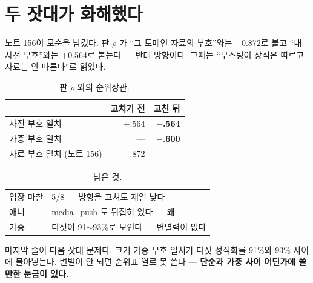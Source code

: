 \documentclass[10pt]{article}
\begin{document}
\section{두 잣대가 화해했다}

노트 156이 모순을 남겼다. 판 $\rho$ 가 ``그 도메인 자료의 부호''와는
$-$0.872로 붙고 ``내 사전 부호''와는 $+$0.564로 붙는다 --- 반대 방향이다.
그때는 ``부스팅이 상식은 따르고 자료는 안 따른다''로 읽었다.

\begin{table}[t]
\centering\tsize
\caption{판 $\rho$ 와의 순위상관.}
\begin{tabular}{lrr}
\toprule
& 고치기 전 & \textbf{고친 뒤} \\
\midrule
사전 부호 일치 & $+$.564 & \textbf{$-$.564} \\
가중 부호 일치 & --- & \textbf{$-$.600} \\
자료 부호 일치 (노트 156) & $-$.872 & --- \\
\bottomrule
\end{tabular}
\end{table}



\begin{table}[t]
\centering\tsize
\caption{남은 것.}
\begin{tabular}{ll}
\toprule
입장 마찰 & 5/8 --- 방향을 고쳐도 제일 낮다 \\
애니 & media\_push 도 뒤집혀 있다 --- 왜 \\
가중 & 다섯이 91$\sim$93\%로 모인다 --- 변별력이 없다 \\
\bottomrule
\end{tabular}
\end{table}

마지막 줄이 다음 잣대 문제다. 크기 가중 부호 일치가 다섯 정식화를 91\%와
93\% 사이에 몰아넣는다. 변별이 안 되면 순위표 열로 못 쓴다 ---
\textbf{단순과 가중 사이 어딘가에 쓸 만한 눈금이 있다.}
\end{document}
